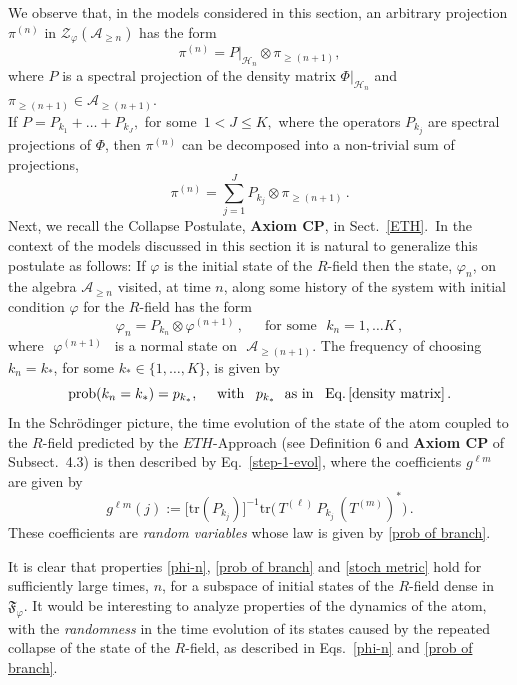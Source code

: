 \documentclass[a4paper,11pt]{article}
\begin{document}
{We observe that, in the models considered in this section, an arbitrary projection $\pi^{(n)}$ in 
$\mathcal{Z}_{\varphi}(\mathcal{A}_{\geq n})$ has the form
$$\pi^{(n)} = P\vert_{\mathcal{H}_n} \otimes \pi_{\geq(n+1)},$$
where $P$ is a spectral projection of the density matrix $\Phi\vert_{\mathcal{H}_n}$ and $\pi_{\geq (n+1)} \in \mathcal{A}_{\geq(n+1)}$.\\ 
If $P= P_{k_1}+\dots + P_{k_J},$ for some \,$1< J\leq K,$ where the operators $P_{k_j}$ are spectral projections of 
$\Phi$, then $\pi^{(n)}$ can be decomposed into a non-trivial sum of projections,
$$\pi^{(n)}= \sum_{j=1}^{J} P_{k_j}\otimes \pi_{\geq(n+1)}\,.$$
Next, we recall the Collapse Postulate, {\bf{Axiom CP}}, in Sect.~\ref{ETH}.~In the context of the models discussed 
in this section it is natural to generalize this postulate as follows: 
If $\varphi$ is the initial state of the $R$-field then the state, $\varphi_n$, on the algebra $\mathcal{A}_{\geq n}$ visited, 
at time $n$, along some history of the system with initial condition $\varphi$ for the $R$-field has the form
\begin{equation}\label{phi-n}
\varphi_{n} = P_{k_n} \otimes \varphi^{(n+1)}\,, \quad \, \text{ for some   }\,\, k_n = 1,\dots K\,,
\end{equation}
where\,\, $\varphi^{(n+1)} $\,\,\ is a normal state on\,\, $\mathcal{A}_{\geq(n+1)}$. The frequency of choosing $k_n=k_{*}$,
for some $k_{*}\in \{1,\dots, K\}$, is given by
\begin{equation}\label{prob of branch}
\text{prob}(k_n=k_{*}) = p_{k_{*}}, \quad \text{ with  }\,\, \,p_{k_{*}} \,\, \text{ as in }\,\, \, \text{Eq.}\,\eqref{density matrix}\,.
\end{equation}
In the Schr\"odinger picture, the time evolution of the state of the atom coupled to the $R$-field predicted by the 
$ETH$-Approach (see Definition 6 and {\bf{Axiom CP}} of Subsect.~4.3) is then described by Eq.~\eqref{step-1-evol}, 
where the coefficients $g^{\ell m}$ are given by
\begin{equation}\label{stoch metric}
g^{\ell m}(j):= \big[\text{tr}(P_{k_j})\big]^{-1} \text{tr}\big(\, T^{(\ell)}\,P_{k_j}\, (T^{(m)})^{*} \big)\,.
\end{equation}
These coefficients are \textit{random variables} whose law is given by \eqref{prob of branch}.

It is clear that properties \eqref{phi-n}, \eqref{prob of branch} and \eqref{stoch metric} hold for sufficiently large times, $n$, for a subspace of initial states of the $R$-field dense in $\mathfrak{F}_{\varphi}$.
It would be interesting to analyze properties of the dynamics of the atom, with the \textit{randomness} in the time evolution of its states caused by the repeated collapse of the state of the $R$-field, as described in Eqs.~\eqref{phi-n} and 
\eqref{prob of branch}.

}
\end{document}
